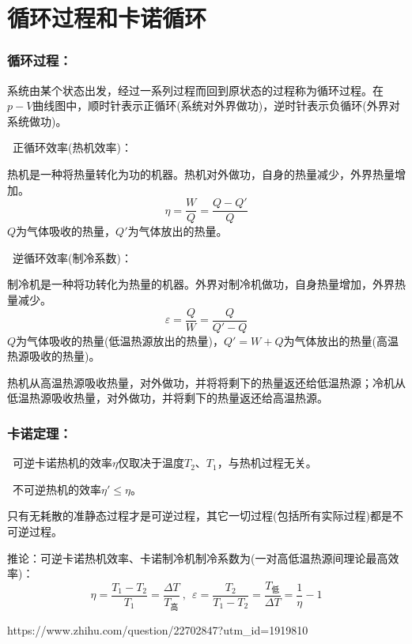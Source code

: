 \documentclass[zihao=-4,UTF8]{report}
\begin{document}
\section{循环过程和卡诺循环}
\subsubsection{循环过程：}
系统由某个状态出发，经过一系列过程而回到原状态的过程称为循环过程。在$p-V$曲线图中，顺时针表示正循环(系统对外界做功)，逆时针表示负循环(外界对系统做功)。\par
{}\ 正循环效率(热机效率)：\par
热机是一种将热量转化为功的机器。热机对外做功，自身的热量减少，外界热量增加。
\begin{equation*}
    \eta = \frac{W}{Q} = \frac{Q - Q'}{Q}
\end{equation*}
{\color{gray}\small $Q$为气体吸收的热量，$Q'$为气体放出的热量。}\par
{}\ 逆循环效率(制冷系数)：\par
制冷机是一种将功转化为热量的机器。外界对制冷机做功，自身热量增加，外界热量减少。
\begin{equation*}
    \varepsilon =\frac{Q}{W} = \frac{Q}{Q' - Q}
\end{equation*}
{\color{gray}\small $Q$为气体吸收的热量(低温热源放出的热量)，$Q'= W+Q$为气体放出的热量(高温热源吸收的热量)。}

热机从高温热源吸收热量，对外做功，并将将剩下的热量返还给低温热源；冷机从低温热源吸收热量，对外做功，并将剩下的热量返还给高温热源。
\subsubsection{卡诺定理：}
\ 可逆卡诺热机的效率$\eta$仅取决于温度$T_2$、$T_1$，与热机过程无关。\par
{}\ 不可逆热机的效率$\eta' \le \eta$。
{\par\color{gray}\small 只有无耗散的准静态过程才是可逆过程，其它一切过程(包括所有实际过程)都是不可逆过程。}\par
推论：可逆卡诺热机效率、卡诺制冷机制冷系数为(一对高低温热源间理论最高效率)：
\begin{equation}
    \eta = \frac{T_1 - T_2}{T_1} = \frac{\Delta T}{T_{\text{高}}}\ ,\ \ \varepsilon = \frac{T_2}{T_1 - T_2} =\frac{T_{\text{低}}}{\Delta T} = \frac{1}{\eta} -1
\end{equation}

https://www.zhihu.com/question/22702847?utm\_id=1919810 \par
\end{document}
